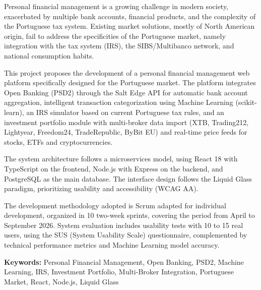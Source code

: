 Personal financial management is a growing challenge in modern society, exacerbated by multiple bank accounts, financial products, and the complexity of the Portuguese tax system. Existing market solutions, mostly of North American origin, fail to address the specificities of the Portuguese market, namely integration with the tax system (IRS), the SIBS/Multibanco network, and national consumption habits.

This project proposes the development of a personal financial management web platform specifically designed for the Portuguese market. The platform integrates Open Banking (PSD2) through the Salt Edge API for automatic bank account aggregation, intelligent transaction categorization using Machine Learning (scikit-learn), an IRS simulator based on current Portuguese tax rules, and an investment portfolio module with multi-broker data import (XTB, Trading212, Lightyear, Freedom24, TradeRepublic, ByBit EU) and real-time price feeds for stocks, ETFs and cryptocurrencies.

The system architecture follows a microservices model, using React 18 with TypeScript on the frontend, Node.js with Express on the backend, and PostgreSQL as the main database. The interface design follows the Liquid Glass paradigm, prioritizing usability and accessibility (WCAG AA).

The development methodology adopted is Scrum adapted for individual development, organized in 10 two-week sprints, covering the period from April to September 2026. System evaluation includes usability tests with 10 to 15 real users, using the SUS (System Usability Scale) questionnaire, complemented by technical performance metrics and Machine Learning model accuracy.

\vspace{0.5cm}
\noindent\textbf{Keywords:} Personal Financial Management, Open Banking, PSD2, Machine Learning, IRS, Investment Portfolio, Multi-Broker Integration, Portuguese Market, React, Node.js, Liquid Glass
